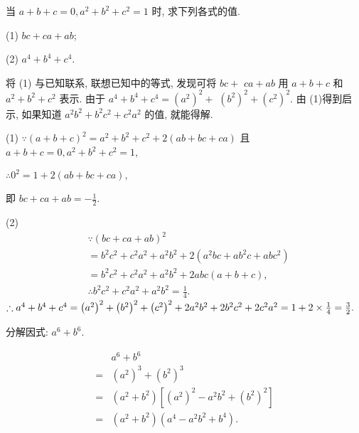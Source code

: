 \begin{example}
	当 $a+b+c=0, a^2+b^2+c^2=1$ 时, 求下列各式的值.

	(1) $b c+c a+a b$;

	(2) $a^4+b^4+c^4$.
\end{example}
\begin{analysis}
	将 (1) 与已知联系, 联想已知中的等式, 发现可将 $b c+$ $c a+a b$ 用 $a+b+c$ 和 $a^2+b^2+c^2$ 表示. 由于 $a^4+b^4+c^4=\left(a^2\right)^2+$ $\left(b^2\right)^2+\left(c^2\right)^2$. 由 (1)得到启示, 如果知道 $a^2 b^2+b^2 c^2+c^2 a^2$ 的值, 就能得解.
\end{analysis}
\begin{solution}
	(1) $\because(a+b+c)^2=a^2+b^2+c^2+2(a b+b c+c a)$
	且 $a+b+c=0, a^2+b^2+c^2=1$,

	$\therefore 0^2=1+2(a b+b c+c a),$

	即 $b c+c a+a b=-\frac{1}{2}$.

	(2)	\begin{align}
		 & \because(b c+c a+a b)^2                                        \\
		 & =b^2 c^2+c^2 a^2+a^2 b^2+2\left(a^2 b c+a b^2 c+a b c^2\right) \\
		 & =b^2 c^2+c^2 a^2+a^2 b^2+2 a b c(a+b+c),                       \\
		 & \therefore b^2 c^2+c^2 a^2+a^2 b^2=\frac{1}{4} .
	\end{align}
	$ \therefore a^4+b^4+c^4=\left(a^2\right)^2+\left(b^2\right)^2+\left(c^2\right)^2+2 a^2 b^2+2 b^2 c^2+2 c^2 a^2 \\
		=1+2 \times \frac{1}{4}=\frac{3}{2} .$
\end{solution}

\begin{example}
	分解因式: $a^6+b^6$.
\end{example}
\begin{solution}
	\begin{align}
		  & a^6+b^6                                                                        \\
		= & \left(a^2\right)^3+\left(b^2\right)^3                                          \\
		= & \left(a^2+b^2\right)\left[\left(a^2\right)^2-a^2 b^2+\left(b^2\right)^2\right] \\
		= & \left(a^2+b^2\right)\left(a^4-a^2 b^2+b^4\right) .
	\end{align}
\end{solution}

